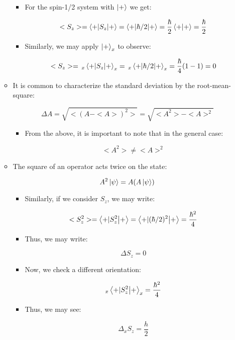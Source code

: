\begin{itemize}
\begin{itemize}
\begin{itemize}
          \item For the spin-1/2 system with $\ket{+}$ we get:

            $$<S_z>=\bra{+|S_z}\ket{+}=\bra{+|\hbar/2}\ket{+}=\frac{\hbar}{2}\braket{+}=\frac{\hbar}{2}$$

          \item Similarly, we may apply $\ket{+}_x$ to observe:

            $$<S_z>=\,_x\bra{+|S_z}\ket{+}_x=\,_x\bra{+|\hbar/2}\ket{+}_x=\frac{\hbar}{4}(1-1)=0$$

        \end{itemize}

      \item It is common to characterize the standard deviation by the root-mean-square:

        $$\Delta A=\sqrt{<(A-<A>)^2>}=\sqrt{<A^2>-<A>^2}$$

        \begin{itemize}

          \item From the above, it is important to note that in the general case:

            $$<A^2>\neq <A>^2$$

        \end{itemize}

      \item The square of an operator acts twice on the state:

        $$A^2\ket{\psi}=A(A\ket{\psi})$$

        \begin{itemize}

          \item Similarly, if we consider $S_z$, we may write:

            $$<S_z^2>=\bra{+|S_z^2}\ket{+}=\bra{+|(\hbar/2)^2}\ket{+}=\frac{\hbar^2}{4}$$

          \item Thus, we may write:

            $$\Delta S_z=0$$

          \item Now, we check a different orientation:

            $$_x\bra{+|S_z^2}\ket{+}_x=\frac{\hbar^2}{4}$$

          \item Thus, we may see:

            $$\Delta_xS_z=\frac{h}{2}$$


\end{itemize}
\end{itemize}
\end{itemize}
